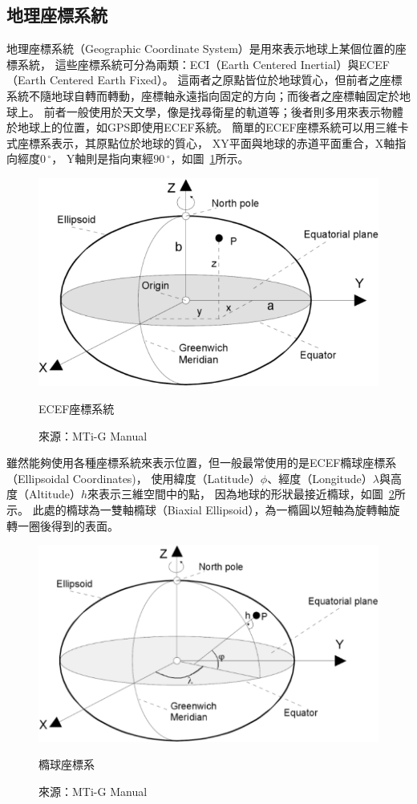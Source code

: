 \subsection{地理座標系統}
地理座標系統（Geographic Coordinate System）是用來表示地球上某個位置的座標系統，
這些座標系統可分為兩類：ECI（Earth Centered Inertial）與ECEF（Earth Centered Earth Fixed）。
這兩者之原點皆位於地球質心，但前者之座標系統不隨地球自轉而轉動，座標軸永遠指向固定的方向；而後者之座標軸固定於地球上。
前者一般使用於天文學，像是找尋衛星的軌道等；後者則多用來表示物體於地球上的位置，如GPS即使用ECEF系統。
簡單的ECEF座標系統可以用三維卡式座標系表示，其原點位於地球的質心，
XY平面與地球的赤道平面重合，X軸指向經度$0\,^{\circ}$，
Y軸則是指向東經$90\,^{\circ}$，如圖~\ref{f:ecef}所示。
\begin{figure}[h!]
	\centering
	\includegraphics[width=.7\textwidth]{figures/algorithm/ECEF}
	\caption{ECEF座標系統}
	\caption*{來源：MTi-G Manual}
	\label{f:ecef}
\end{figure}

雖然能夠使用各種座標系統來表示位置，但一般最常使用的是ECEF橢球座標系（Ellipsoidal Coordinates)，
使用緯度（Latitude）$\phi$、經度（Longitude）$\lambda$與高度（Altitude）$h$來表示三維空間中的點，
因為地球的形狀最接近橢球，如圖~\ref{f:ellipsoid}所示。
此處的橢球為一雙軸橢球（Biaxial Ellipsoid），為一橢圓以短軸為旋轉軸旋轉一圈後得到的表面。
\begin{figure}[h!]
	\centering
	\includegraphics[width=.7\textwidth]{figures/algorithm/ellipsoid}
	\caption{橢球座標系}
	\caption*{來源：MTi-G Manual}
	\label{f:ellipsoid}
\end{figure}

